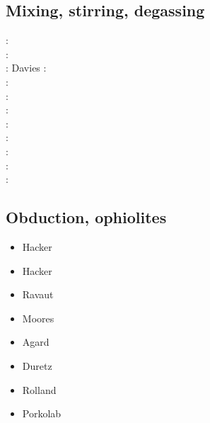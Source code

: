 \subsection{Mixing, stirring, degassing} 

\begin{scriptsize}
\nineteeneightyfour: \cite{olyb84}\\
\nineteenninety: \cite{ketu90}\\
\nineteenninety: Davies \cite{davi90}
\nineteenninetysix: \cite{pelt96}\\
\nineteenninetynine: \cite{cori99}\\
\twothousandone: \cite{huke01}\\
\twothousandtwo: \cite{vahb02}\\
\twothousandthree: \cite{fasa03}\cite{vabh03}\\
\twothousandfive: \cite{colt05}\\
\twothousandseven: \cite{gogc07}\cite{nake07}\cite{vabh07}\\
\twothousandeleven: \cite{lemj11}\cite{saad11}\\
\twothousandeighteen: \cite{onzh18}
\end{scriptsize}

\subsection{Obduction, ophiolites}
 

\begin{scriptsize}
\begin{itemize}
\item[\nineteenninety] Hacker \cite{hack90}
\item[\nineteenninetyone] Hacker \cite{hack91}
\item[\nineteenninetyseven] Ravaut \etal \cite{rabh97}
\item[\twothousand] Moores \etal \cite{mokd00}
\item[\twothousandfourteen] Agard \etal \cite{agzf14}
\item[\twothousandsixteen] Duretz \etal \cite{duay16}
\item[\twothousandtwenty] Rolland \etal \cite{rohb20}
\item[\twothousandtwentyone] Porkolab \etal \cite{pody21}
\end{itemize}
\end{scriptsize}

